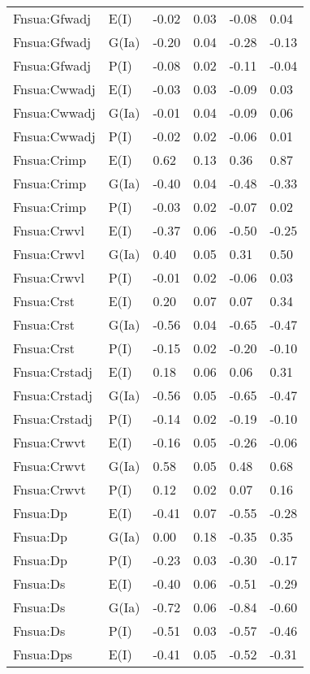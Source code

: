 \begin{center}
\begin{longtable}{|p{1.1in}|p{0.7in}|p{0.7in}|p{0.6in}|p{0.6in}|p{0.6in}|}
  Fnsua:Gfwadj & E(I) & -0.02 & 0.03 & -0.08 & 0.04 \\ 
  Fnsua:Gfwadj & G(Ia) & -0.20 & 0.04 & -0.28 & -0.13 \\ 
  Fnsua:Gfwadj & P(I) & -0.08 & 0.02 & -0.11 & -0.04 \\ 
  Fnsua:Cwwadj & E(I) & -0.03 & 0.03 & -0.09 & 0.03 \\ 
  Fnsua:Cwwadj & G(Ia) & -0.01 & 0.04 & -0.09 & 0.06 \\ 
  Fnsua:Cwwadj & P(I) & -0.02 & 0.02 & -0.06 & 0.01 \\ 
  Fnsua:Crimp & E(I) & 0.62 & 0.13 & 0.36 & 0.87 \\ 
  Fnsua:Crimp & G(Ia) & -0.40 & 0.04 & -0.48 & -0.33 \\ 
  Fnsua:Crimp & P(I) & -0.03 & 0.02 & -0.07 & 0.02 \\ 
  Fnsua:Crwvl & E(I) & -0.37 & 0.06 & -0.50 & -0.25 \\ 
  Fnsua:Crwvl & G(Ia) & 0.40 & 0.05 & 0.31 & 0.50 \\ 
  Fnsua:Crwvl & P(I) & -0.01 & 0.02 & -0.06 & 0.03 \\ 
  Fnsua:Crst & E(I) & 0.20 & 0.07 & 0.07 & 0.34 \\ 
  Fnsua:Crst & G(Ia) & -0.56 & 0.04 & -0.65 & -0.47 \\ 
  Fnsua:Crst & P(I) & -0.15 & 0.02 & -0.20 & -0.10 \\ 
  Fnsua:Crstadj & E(I) & 0.18 & 0.06 & 0.06 & 0.31 \\ 
  Fnsua:Crstadj & G(Ia) & -0.56 & 0.05 & -0.65 & -0.47 \\ 
  Fnsua:Crstadj & P(I) & -0.14 & 0.02 & -0.19 & -0.10 \\ 
  Fnsua:Crwvt & E(I) & -0.16 & 0.05 & -0.26 & -0.06 \\ 
  Fnsua:Crwvt & G(Ia) & 0.58 & 0.05 & 0.48 & 0.68 \\ 
  Fnsua:Crwvt & P(I) & 0.12 & 0.02 & 0.07 & 0.16 \\ 
  Fnsua:Dp & E(I) & -0.41 & 0.07 & -0.55 & -0.28 \\ 
  Fnsua:Dp & G(Ia) & 0.00 & 0.18 & -0.35 & 0.35 \\ 
  Fnsua:Dp & P(I) & -0.23 & 0.03 & -0.30 & -0.17 \\ 
  Fnsua:Ds & E(I) & -0.40 & 0.06 & -0.51 & -0.29 \\ 
  Fnsua:Ds & G(Ia) & -0.72 & 0.06 & -0.84 & -0.60 \\ 
  Fnsua:Ds & P(I) & -0.51 & 0.03 & -0.57 & -0.46 \\ 
  Fnsua:Dps & E(I) & -0.41 & 0.05 & -0.52 & -0.31 \\ 

\end{longtable}
\end{center}
